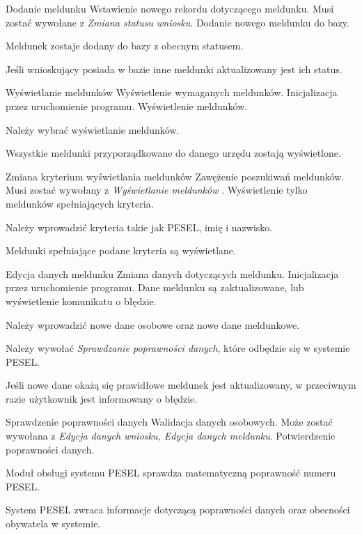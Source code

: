 \documentclass[12pt]{article}
\begin{document}
\scenario
    {Dodanie meldunku}
    {Wstawienie nowego rekordu dotyczącego meldunku.}
    {Musi zostać wywołane z \textit{Zmiana statusu wniosku}.}
    {Dodanie nowego meldunku do bazy.}
    {
        \item Meldunek zostaje dodany do bazy z obecnym statusem.
        \item Jeśli wnioskujący posiada w bazie inne meldunki aktualizowany jest ich status.
    }
    \scenario
    {Wyświetlanie meldunków}
    {Wyświetlenie wymaganych meldunków.}
    {Inicjalizacja przez uruchomienie programu.}
    {Wyświetlenie meldunków.}
    {
        \item Należy wybrać wyświetlanie meldunków.
        \item Wszystkie meldunki przyporządkowane do danego urzędu zostają wyświetlone.
    }
\scenario
    {Zmiana kryterium wyświetlania meldunków}
    {Zawężenie poszukiwań meldunków.}
    {Musi zostać wywołany z \textit{Wyświetlanie meldunków} .}
    {Wyświetlenie tylko meldunków spełniających kryteria.}
    {
        \item Należy wprowadzić kryteria takie jak PESEL, imię i nazwisko.
        \item Meldunki spełniające podane kryteria są wyświetlane.
    }
\scenario
    {Edycja danych meldunku}
    {Zmiana danych dotyczących meldunku.}
    {Inicjalizacja przez uruchomienie programu.}
    {Dane meldunku są zaktualizowane, lub wyświetlenie komunikatu o błędzie.}
    {
        \item Należy wprowadzić nowe dane osobowe oraz nowe dane meldunkowe.
        \item Należy wywołać \textit{Sprawdzanie poprawności danych}, które odbędzie się w systemie PESEL.
        \item Jeśli nowe dane okażą się prawidłowe meldunek jest aktualizowany, w przeciwnym razie użytkownik jest informowany o błędzie.
    }
\scenario
    {Sprawdzenie poprawności danych}
    {Walidacja danych osobowych.}
    {Może zostać wywołana z \textit{Edycja danych wniosku, Edycja danych meldunku}.}
    {Potwierdzenie poprawności danych.}
    {
        \item Moduł obsługi systemu PESEL sprawdza matematyczną poprawność numeru PESEL.
        \item System PESEL zwraca informacje dotyczącą poprawności danych oraz obecności obywatela w systemie.
    }
\end{document}
